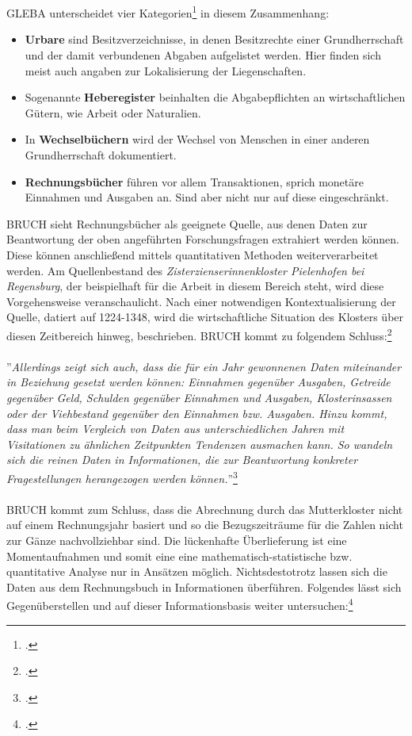 \documentclass[12pt,a4paper]{article}
\begin{document}
\\
\\
GLEBA unterscheidet vier Kategorien\footcite[][S.51--54]{gleba2016rechnen} in diesem Zusammenhang:
\begin{itemize}
\item \textbf{Urbare} sind Besitzverzeichnisse, in denen Besitzrechte einer Grundherrschaft und der damit verbundenen Abgaben aufgelistet werden. Hier finden sich meist auch angaben zur Lokalisierung der Liegenschaften.
\item Sogenannte \textbf{Heberegister} beinhalten die Abgabepflichten an wirtschaftlichen Gütern, wie Arbeit oder Naturalien.
\item In \textbf{Wechselbüchern} wird der Wechsel von Menschen in einer anderen Grundherrschaft dokumentiert. 
\item \textbf{Rechnungsbücher} führen vor allem Transaktionen, sprich monetäre Einnahmen und Ausgaben an. Sind aber nicht nur auf diese eingeschränkt.
\end{itemize}
BRUCH sieht Rechnungsbücher als geeignete Quelle, aus denen Daten zur Beantwortung der oben angeführten Forschungsfragen extrahiert werden können. Diese können anschließend mittels quantitativen Methoden weiterverarbeitet werden. Am Quellenbestand des \textit{Zisterzienserinnenkloster Pielenhofen bei Regensburg}, der beispielhaft für die Arbeit in diesem Bereich steht, wird diese Vorgehensweise veranschaulicht. Nach einer notwendigen Kontextualisierung der Quelle, datiert auf 1224-1348, wird die wirtschaftliche Situation des Klosters über diesen Zeitbereich hinweg, beschrieben. BRUCH kommt zu folgendem Schluss:\footcite[][S.13-37]{bruch2015daten}
\\
\\
''\textit{Allerdings zeigt sich auch, dass die für ein Jahr gewonnenen Daten miteinander in Beziehung gesetzt werden können: Einnahmen gegenüber Ausgaben, Getreide gegenüber Geld, Schulden gegenüber Einnahmen und Ausgaben, Klosterinsassen oder der Viehbestand gegenüber den Einnahmen bzw. Ausgaben. Hinzu kommt, dass man beim Vergleich von Daten aus unterschiedlichen Jahren mit Visitationen zu ähnlichen Zeitpunkten Tendenzen ausmachen kann. So wandeln sich die reinen Daten in Informationen, die zur Beantwortung konkreter Fragestellungen herangezogen werden können.}''\footcite[Vgl.][S.37]{bruch2015daten}
\\
\\
BRUCH kommt zum Schluss, dass die Abrechnung durch das Mutterkloster nicht auf einem Rechnungsjahr basiert und so die Bezugszeiträume für die Zahlen nicht zur Gänze nachvollziehbar sind. Die lückenhafte Überlieferung ist eine Momentaufnahmen und somit eine eine mathematisch-statistische bzw. quantitative Analyse nur in Ansätzen möglich. Nichtsdestotrotz lassen sich die Daten aus dem Rechnungsbuch in Informationen überführen. Folgendes lässt sich Gegenüberstellen und auf dieser Informationsbasis weiter untersuchen:\footcite[][S.37-44]{bruch2015daten}
\end{document}
